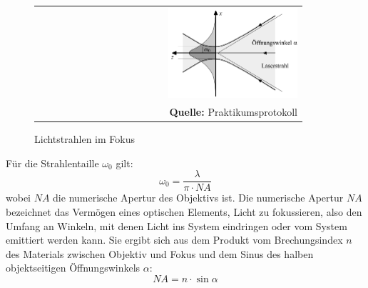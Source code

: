 \documentclass[a4paper,titlepage]{scrartcl}
\numberwithin{equation}{section}
\begin{document}
\begin{figure}[H]
	\centering
	\begin{tabular}{@{}r@{}}
		\includegraphics[width=0.5\textwidth]{rayleigh.png}\\
		\footnotesize\sffamily\textbf{Quelle:} Praktikumsprotokoll \cite{protokoll}
	\end{tabular}
	\caption{Lichtstrahlen im Fokus}
    \label{fig:rayleigh}
\end{figure}
Für die Strahlentaille $\omega_0$ gilt:
\begin{equation*}
\omega_0=\frac{\lambda}{\pi \cdot NA}
\end{equation*}
wobei $NA$ die numerische Apertur des Objektivs ist. Die numerische Apertur $NA$ bezeichnet das Vermögen eines optischen Elements, Licht zu fokussieren, also den Umfang an Winkeln, mit denen Licht ins System eindringen oder vom System emittiert werden kann. Sie ergibt sich aus dem Produkt vom Brechungsindex $n$ des Materials zwischen Objektiv und Fokus und dem Sinus des halben objektseitigen Öffnungswinkels $\alpha$:
\begin{equation*}
NA=n\cdot \sin \alpha
\end{equation*}
\end{document}
